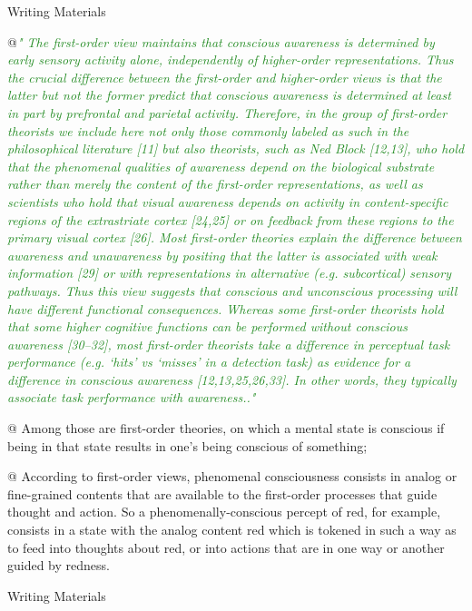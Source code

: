 \documentclass[utf8]{article}
\newenvironment{writingMaterials}
			{	
			\begin{tcolorbox}[size=small, colframe=black!20!white, toprule=1mm]
				Writing Materials
			\end{tcolorbox}
			
			\begin{easylist}[itemize]		
			}
			{
			\end{easylist}
			\begin{tcolorbox}[size=small, bottomrule=1mm, halign=flush right, colframe=black!20!white]
				Writing Materials
			\end{tcolorbox}			
			}
\newcommand{\rewrite}[1]{\textcolor{ForestGreen}{\textit{"#1"}}\newline}
\begin{document}
			\begin{writingMaterials}
				@\rewrite{
					The ﬁrst-order view maintains that conscious awareness is determined by early sensory activity alone, independently of higher-order representations. Thus the crucial difference between the ﬁrst-order and higher-order views is that the latter but not the former predict that conscious awareness is determined at least in part by prefrontal and parietal activity. Therefore, in the group of ﬁrst-order theorists we include here not only those commonly labeled as such in the philosophical literature [11] but also theorists, such as Ned Block [12,13], who hold that the phenomenal qualities of awareness depend on the biological substrate rather than merely the content of the ﬁrst-order representations, as well as scientists who hold that visual awareness depends on activity in content-speciﬁc regions of the extrastriate cortex [24,25] or on feedback from these regions to the primary visual cortex [26]. Most ﬁrst-order theories explain the difference between awareness and unawareness by positing that the latter is associated with weak information [29] or with representations in alternative (e.g. subcortical) sensory pathways. Thus this view suggests that conscious and unconscious processing will have different functional consequences. Whereas some ﬁrst-order theorists hold that some higher cognitive functions can be performed without conscious awareness [30–32], most ﬁrst-order theorists take a difference in perceptual task performance (e.g. ‘hits’ vs ‘misses’ in a detection task) as evidence for a difference in conscious awareness [12,13,25,26,33]. In other words, they typically associate task performance with awareness..} \cite{lau2011empirical}
				
				@ Among those are first-order theories, on which a mental state is conscious if being in that state results in one’s being conscious of something;
				
				
				@  According to first-order views, phenomenal consciousness consists in analog or fine-grained contents that are available to the first-order processes that guide thought and action. So a phenomenally-conscious percept of red, for example, consists in a state with the analog content red which is tokened in such a way as to feed into thoughts about red, or into actions that are in one way or another guided by redness. 
				
			\end{writingMaterials}
		
		
		
\end{document}

